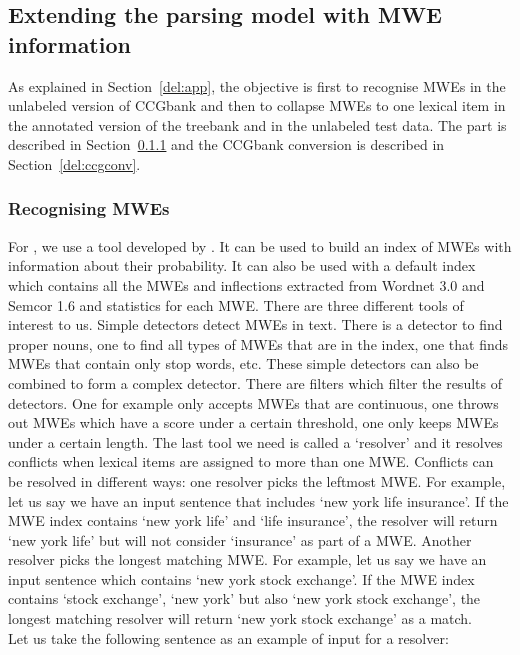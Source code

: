 \documentclass[output=paper]{langsci/langscibook}
\begin{document}
\subsection{Extending the parsing model with MWE information}
\label{del:extension}

\indent As explained in Section~\ref{del:app}, the objective is first to recognise MWEs in the unlabeled version of CCGbank and then to collapse MWEs to one lexical item in the annotated version of the treebank and in the unlabeled test data. The  part is described in Section~\ref{del:mwerec} and the CCGbank conversion is described in Section~\ref{del:ccgconv}. 

\subsubsection{Recognising MWEs}
\label{del:mwerec}
\indent For , we use a tool developed by \citet{finlayson2011}. It can be used to build an index of MWEs with information about their probability. It can also be used with a default index which contains all the MWEs and inflections extracted from Wordnet 3.0 and Semcor 1.6 and statistics for each MWE. There are three different tools of interest to us. Simple detectors detect MWEs in text. There is a detector to find proper nouns, one to find all types of MWEs that are in the index, one that finds MWEs that contain only stop words, etc. These simple detectors can also be combined to form a complex detector. There are filters which filter the results of detectors. One for example only accepts MWEs that are continuous, one throws out MWEs which have a score under a certain threshold, one only keeps MWEs under a certain length. The last tool we need is called a `resolver' and it resolves conflicts when lexical items are assigned to more than one MWE. Conflicts can be resolved in different ways: one resolver picks the leftmost MWE. For example, let us say we have an input sentence that includes `new york life insurance'. If the MWE index contains `new york life' and `life insurance', the resolver will return `new york life' but will not consider `insurance' as part of a MWE. Another resolver picks the longest matching MWE. For example, let us say we have an input sentence which contains `new york stock exchange'. If the MWE index contains `stock exchange', `new york' but also `new york stock exchange', the longest matching resolver will return `new york stock exchange' as a match. \\
\indent Let us take the following sentence as an example of input for a resolver:
\end{document}
